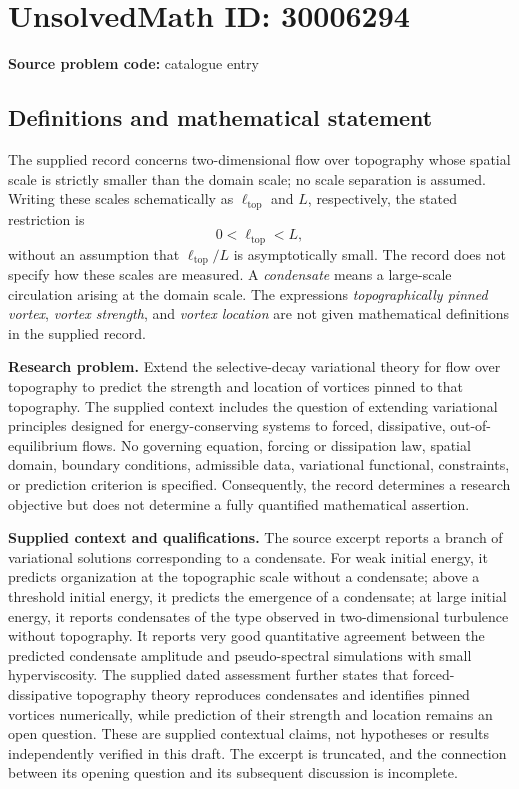 \documentclass[11pt]{article}
\begin{document}
\section*{UnsolvedMath ID: 30006294}
\textbf{Source problem code:} catalogue entry
\subsection{Definitions and mathematical statement}
The supplied record concerns two-dimensional flow over topography whose spatial scale is strictly smaller than the domain scale; no scale separation is assumed. Writing these scales schematically as \(\ell_{\mathrm{top}}\) and \(L\), respectively, the stated restriction is
\[
0<\ell_{\mathrm{top}}<L,
\]
without an assumption that \(\ell_{\mathrm{top}}/L\) is asymptotically small. The record does not specify how these scales are measured. A \emph{condensate} means a large-scale circulation arising at the domain scale. The expressions \emph{topographically pinned vortex}, \emph{vortex strength}, and \emph{vortex location} are not given mathematical definitions in the supplied record.

\textbf{Research problem.} Extend the selective-decay variational theory for flow over topography to predict the strength and location of vortices pinned to that topography. The supplied context includes the question of extending variational principles designed for energy-conserving systems to forced, dissipative, out-of-equilibrium flows. No governing equation, forcing or dissipation law, spatial domain, boundary conditions, admissible data, variational functional, constraints, or prediction criterion is specified. Consequently, the record determines a research objective but does not determine a fully quantified mathematical assertion.

\textbf{Supplied context and qualifications.} The source excerpt reports a branch of variational solutions corresponding to a condensate. For weak initial energy, it predicts organization at the topographic scale without a condensate; above a threshold initial energy, it predicts the emergence of a condensate; at large initial energy, it reports condensates of the type observed in two-dimensional turbulence without topography. It reports very good quantitative agreement between the predicted condensate amplitude and pseudo-spectral simulations with small hyperviscosity. The supplied dated assessment further states that forced-dissipative topography theory reproduces condensates and identifies pinned vortices numerically, while prediction of their strength and location remains an open question. These are supplied contextual claims, not hypotheses or results independently verified in this draft. The excerpt is truncated, and the connection between its opening question and its subsequent discussion is incomplete.
\end{document}
